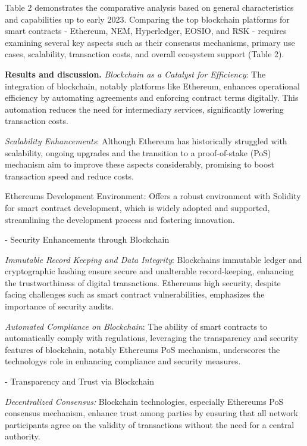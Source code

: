 Table 2 demonstrates the comparative analysis based on general
characteristics and capabilities up to early 2023. Comparing the top
blockchain platforms for smart contracts - Ethereum, NEM, Hyperledger,
EOSIO, and RSK - requires examining several key aspects such as their
consensus mechanisms, primary use cases, scalability, transaction costs,
and overall ecosystem support (Table 2).

\textbf{Results and discussion.} \emph{Blockchain as a Catalyst for
Efficiency}: The integration of blockchain, notably platforms like
Ethereum, enhances operational efficiency by automating agreements and
enforcing contract terms digitally. This automation reduces the need for
intermediary services, significantly lowering transaction costs.

\emph{Scalability Enhancements}: Although Ethereum has historically
struggled with scalability, ongoing upgrades and the transition to a
proof-of-stake (PoS) mechanism aim to improve these aspects
considerably, promising to boost transaction speed and reduce costs.

Ethereum\textquotesingle s Development Environment: Offers a robust
environment with Solidity for smart contract development, which is
widely adopted and supported, streamlining the development process and
fostering innovation.

- Security Enhancements through Blockchain

\emph{Immutable Record Keeping and Data Integrity}:
Blockchain\textquotesingle s immutable ledger and cryptographic hashing
ensure secure and unalterable record-keeping, enhancing the
trustworthiness of digital transactions. Ethereum\textquotesingle s high
security, despite facing challenges such as smart contract
vulnerabilities, emphasizes the importance of security audits.

\emph{Automated Compliance on Blockchain}: The ability of smart
contracts to automatically comply with regulations, leveraging the
transparency and security features of blockchain, notably
Ethereum\textquotesingle s PoS mechanism, underscores the
technology\textquotesingle s role in enhancing compliance and security
measures.

- Transparency and Trust via Blockchain

\emph{Decentralized Consensus:} Blockchain technologies, especially
Ethereum\textquotesingle s PoS consensus mechanism, enhance trust among
parties by ensuring that all network participants agree on the validity
of transactions without the need for a central authority.

